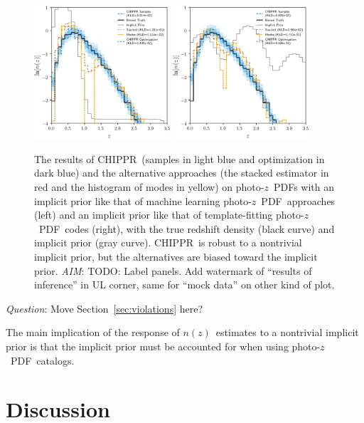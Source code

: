 \documentclass[iop]{emulateapj}
\newcommand{\todo}[3]{{\color{#2}\emph{#1}: #3}}
\newcommand{\aim}[1]{\todo{AIM}{red}{#1}}
\newcommand{\que}[1]{\todo{Question}{cyan}{#1}}
\newcommand{\Sect}[1]{Section~\ref{#1}}
\newcommand{\project}[1]{\textsc{#1}}
\newcommand{\Chippr}{\project{CHIPPR}}%
\newcommand{\pz}{photo-$z$}
\newcommand{\pzpdf}{\pz\ PDF}%
\newcommand{\nz}{$n(z)$}
\begin{document}
\begin{figure}
	\begin{center}
	\includegraphics[width=0.45\textwidth]{figures/chippr/results_trpr.png}
	\includegraphics[width=0.45\textwidth]{figures/chippr/results_tmpr.png}
	\caption{
		The results of \Chippr\ (samples in light blue and optimization in dark blue) and the alternative approaches (the stacked estimator in red and the histogram of modes in yellow) on \pzpdf s with an implicit prior like that of machine learning \pzpdf\ approaches (left) and an implicit prior like that of template-fitting \pzpdf\ codes (right), with the true redshift density (black curve) and implicit prior (gray curve).
		\Chippr\ is robust to a nontrivial implicit prior, but the alternatives are biased toward the implicit prior.
		\aim{TODO: Label panels.
		Add watermark of ``results of inference'' in UL corner, same for ``mock data'' on other kind of plot.}
	}
	\label{fig:results-priors}
	\end{center}
\end{figure}

\que{Move \Sect{sec:violations} here?}

The main implication of the response of \nz\ estimates to a nontrivial implicit prior is that the implicit prior must be accounted for when using \pzpdf\ catalogs.

\section{Discussion}
\label{sec:results}
\end{document}

